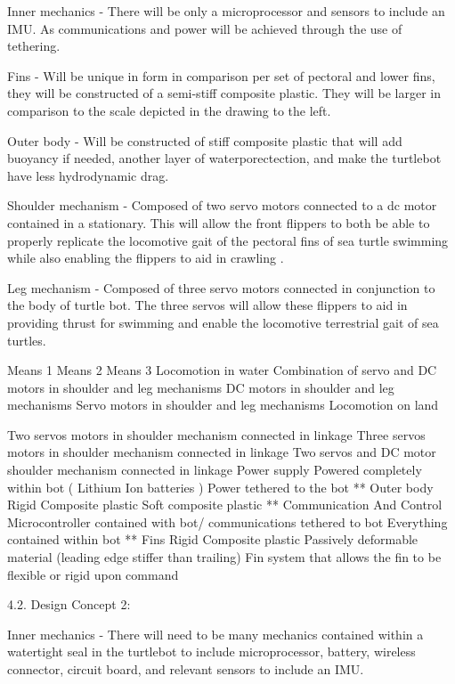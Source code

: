Inner mechanics - There will be only a microprocessor and sensors to include an IMU.  As communications and power will be achieved through the use of tethering. 

Fins - Will be unique in form in comparison per set of pectoral and lower fins, they will be constructed of a semi-stiff composite plastic. They will be larger in comparison to the scale depicted in the drawing to the left. 

Outer body - Will be constructed of stiff composite plastic that will add buoyancy if needed, another layer of waterporectection, and make the turtlebot have less hydrodynamic drag. 

Shoulder mechanism - Composed of two servo motors connected to a dc motor contained in a stationary. This will allow the front flippers to both be able to properly replicate the locomotive  gait of the pectoral fins of sea turtle swimming while also enabling the flippers to aid in crawling .

Leg mechanism - Composed of three servo motors connected in conjunction to the body of turtle bot. The three servos will allow these flippers to aid in providing thrust for swimming and enable the locomotive terrestrial gait of sea turtles.   








Means 1
Means 2
Means 3
Locomotion in water 
Combination of servo and DC motors in shoulder and leg mechanisms 
DC motors in shoulder and leg mechanisms
Servo motors in shoulder and leg mechanisms
Locomotion on land 

Two servos motors in shoulder mechanism connected in linkage 
Three servos motors in shoulder mechanism connected in linkage 
Two servos and DC motor shoulder mechanism connected in linkage 
Power supply 
Powered completely within bot ( Lithium Ion batteries )
Power tethered to the bot 
**
Outer body 
Rigid Composite plastic 
Soft composite plastic
**
Communication
 And Control
Microcontroller contained with bot/ communications tethered to bot
Everything contained within bot 
**
Fins 
Rigid Composite plastic
Passively deformable material (leading edge stiffer than trailing) 
Fin system that allows the fin to be flexible or rigid upon command 

        4.2. Design Concept 2: 

Inner mechanics - There will need to be many mechanics contained within a watertight seal in the turtlebot to include microprocessor, battery, wireless connector, circuit board, and relevant sensors to include an IMU.

